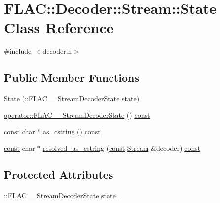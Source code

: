 \hypertarget{class_f_l_a_c_1_1_decoder_1_1_stream_1_1_state}{}\section{F\+L\+AC\+:\+:Decoder\+:\+:Stream\+:\+:State Class Reference}
\label{class_f_l_a_c_1_1_decoder_1_1_stream_1_1_state}


{\ttfamily \#include $<$decoder.\+h$>$}

\subsection*{Public Member Functions}
\begin{DoxyCompactItemize}
\item 
\hyperlink{class_f_l_a_c_1_1_decoder_1_1_stream_1_1_state_a7bb916c135589c18d457a8c23c0d0baf}{State} (\+::\hyperlink{group__flac__stream__decoder_ga3adb6891c5871a87cd5bbae6c770ba2d}{F\+L\+A\+C\+\_\+\+\_\+\+Stream\+Decoder\+State} state)
\item 
\hyperlink{class_f_l_a_c_1_1_decoder_1_1_stream_1_1_state_acb2eff55cf4bba0134acb45bf7227b6b}{operator\+::\+F\+L\+A\+C\+\_\+\+\_\+\+Stream\+Decoder\+State} () \hyperlink{getopt1_8c_a2c212835823e3c54a8ab6d95c652660e}{const} 
\item 
\hyperlink{getopt1_8c_a2c212835823e3c54a8ab6d95c652660e}{const} char $\ast$ \hyperlink{class_f_l_a_c_1_1_decoder_1_1_stream_1_1_state_a7924b059d1bb8a74a37af637b0839a4e}{as\+\_\+cstring} () \hyperlink{getopt1_8c_a2c212835823e3c54a8ab6d95c652660e}{const} 
\item 
\hyperlink{getopt1_8c_a2c212835823e3c54a8ab6d95c652660e}{const} char $\ast$ \hyperlink{class_f_l_a_c_1_1_decoder_1_1_stream_1_1_state_ab56d202157b96b144fd35bb7e7ff9e0a}{resolved\+\_\+as\+\_\+cstring} (\hyperlink{getopt1_8c_a2c212835823e3c54a8ab6d95c652660e}{const} \hyperlink{class_f_l_a_c_1_1_decoder_1_1_stream}{Stream} \&decoder) \hyperlink{getopt1_8c_a2c212835823e3c54a8ab6d95c652660e}{const} 
\end{DoxyCompactItemize}
\subsection*{Protected Attributes}
\begin{DoxyCompactItemize}
\item 
\+::\hyperlink{group__flac__stream__decoder_ga3adb6891c5871a87cd5bbae6c770ba2d}{F\+L\+A\+C\+\_\+\+\_\+\+Stream\+Decoder\+State} \hyperlink{class_f_l_a_c_1_1_decoder_1_1_stream_1_1_state_a7556fad1c76397875bb059c5875ff4a7}{state\+\_\+}
\end{DoxyCompactItemize}


